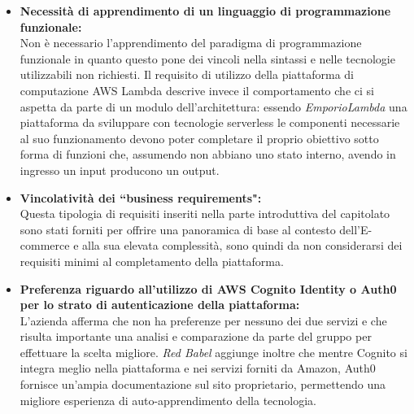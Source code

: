 \begin{itemize}
\item \textbf{Necessità di apprendimento di un linguaggio di programmazione funzionale:} \\
Non è necessario l'apprendimento del paradigma di programmazione funzionale in quanto questo pone dei vincoli nella sintassi e nelle tecnologie utilizzabili non richiesti. Il requisito di utilizzo della piattaforma di computazione AWS Lambda descrive invece il comportamento che ci si aspetta da parte di un modulo dell'architettura: essendo \textit{EmporioLambda} una piattaforma da sviluppare con tecnologie serverless le componenti necessarie al suo funzionamento devono poter completare il proprio obiettivo sotto forma di funzioni che, assumendo non abbiano uno stato interno, avendo in ingresso un input producono un output.
\item \textbf{Vincolatività dei ``business requirements":} \\
Questa tipologia di requisiti inseriti nella parte introduttiva del capitolato sono stati forniti per offrire una panoramica di base al contesto dell'E-commerce e alla sua elevata complessità, sono quindi da non considerarsi dei requisiti minimi al completamento della piattaforma.
\item \textbf{Preferenza riguardo all'utilizzo di AWS Cognito Identity o Auth0 per lo strato di autenticazione della piattaforma:} \\
L'azienda afferma che non ha preferenze per nessuno dei due servizi e che risulta importante una analisi e comparazione da parte del gruppo per effettuare la scelta migliore. \textit{Red Babel} aggiunge inoltre che mentre Cognito si integra meglio nella piattaforma e nei servizi forniti da Amazon, Auth0 fornisce un'ampia documentazione sul sito proprietario, permettendo una migliore esperienza di auto-apprendimento della tecnologia.
\end{itemize}

